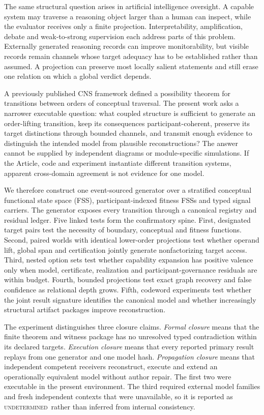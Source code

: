 \documentclass[10pt]{article}
\newcommand{\Und}{\textsc{undetermined}}
\begin{document}
The same structural question arises in artificial intelligence oversight. A capable system may traverse a reasoning object larger than a human can inspect, while the evaluator receives only a finite projection. Interpretability, amplification, debate and weak-to-strong supervision each address parts of this problem\citep{murdoch2019,rudin2019,christiano2018,irving2018,burns2023}. Externally generated reasoning records can improve monitorability, but visible records remain channels whose target adequacy has to be established rather than assumed\citep{korbak2025,emmons2025}. A projection can preserve most locally salient statements and still erase one relation on which a global verdict depends.

A previously published CNS framework defined a possibility theorem for transitions between orders of conceptual traversal\citep{williams2026}. The present work asks a narrower executable question: what coupled structure is sufficient to generate an order-lifting transition, keep its consequences participant-coherent, preserve its target distinctions through bounded channels, and transmit enough evidence to distinguish the intended model from plausible reconstructions? The answer cannot be supplied by independent diagrams or module-specific simulations. If the Article, code and experiment instantiate different transition systems, apparent cross-domain agreement is not evidence for one model.

We therefore construct one event-sourced generator over a stratified conceptual functional state space (FSS), participant-indexed fitness FSSs and typed signal carriers. The generator exposes every transition through a canonical registry and residual ledger. Five linked tests form the confirmatory spine. First, designated target pairs test the necessity of boundary, conceptual and fitness functions. Second, paired worlds with identical lower-order projections test whether operand lift, global span and certification jointly generate nonfactorizing target access. Third, nested option sets test whether capability expansion has positive valence only when model, certificate, realization and participant-governance residuals are within budget. Fourth, bounded projections test exact graph recovery and false confidence as relational depth grows. Fifth, codeword experiments test whether the joint result signature identifies the canonical model and whether increasingly structural artifact packages improve reconstruction.

The experiment distinguishes three closure claims. \emph{Formal closure} means that the finite theorem and witness package has no unresolved typed contradiction within its declared targets. \emph{Execution closure} means that every reported primary result replays from one generator and one model hash. \emph{Propagation closure} means that independent competent receivers reconstruct, execute and extend an operationally equivalent model without author repair. The first two were executable in the present environment. The third required external model families and fresh independent contexts that were unavailable, so it is reported as \Und\ rather than inferred from internal consistency.
\end{document}
